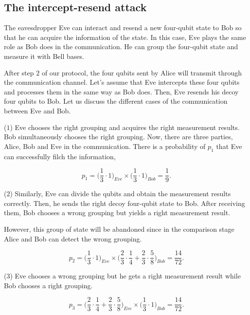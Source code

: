 \documentclass[a4paper,11pt]{article}
\begin{document}
\subsection{The intercept-resend attack}
The eavesdropper Eve can interact and resend a new four-qubit state to Bob so that he can acquire the information of the state. In this case, Eve plays the same role as Bob does in the communication. He can group the four-qubit state and measure it with Bell bases.

After step $2$ of our protocol, the four qubits sent by Alice will transmit through the communication channel. Let’s assume that Eve intercepts these four qubits and processes
them in the same way as Bob does. Then, Eve resends his decoy four qubits to Bob. Let us discuss the different cases of the communication between Eve and Bob.

($1$) Eve chooses the right grouping and acquires the right measurement results. Bob simultaneously chooses the right grouping. Now, there are three parties, Alice, Bob and Eve
in the communication. There is a probability of $p_1$ that Eve can successfully filch the information,

\begin{equation*}
 p_1 = \Big(\dfrac{1}{3} \cdot 1 \Big)_{Eve} \times  \Big(\dfrac{1}{3} \cdot 1 \Big)_{Bob} = \dfrac{1}{9}.
\end{equation*}

(2) Similarly, Eve can divide the qubits and obtain the measurement results correctly. Then, he sends the right decoy four-qubit state to Bob. After receiving them, Bob chooses a wrong grouping but yields a right measurement result.

However, this group of state will be abandoned since in the comparison stage Alice and Bob can detect the wrong grouping.

\begin{equation*}
p_2 = \Big(\dfrac{1}{3}\cdot 1 \Big)_{Eve} \times \Big(\dfrac{2}{3}\cdot \dfrac{1}{4} + 
\dfrac{2}{3} \cdot \dfrac{5}{8} \Big)_{Bob} = \dfrac{14}{72}.
\end{equation*}

(3) Eve chooses a wrong grouping but he gets a right measurement result while Bob chooses a right grouping.

\begin{equation*}
p_3 = \Big(\dfrac{2}{3}\cdot \dfrac{1}{4} + 
\dfrac{2}{3} \cdot \dfrac{5}{8} \Big)_{Eve} \times \Big( \dfrac{1}{3}\cdot 1 \Big)_{Bob} = \dfrac{14}{72}.
\end{equation*}
\end{document}
